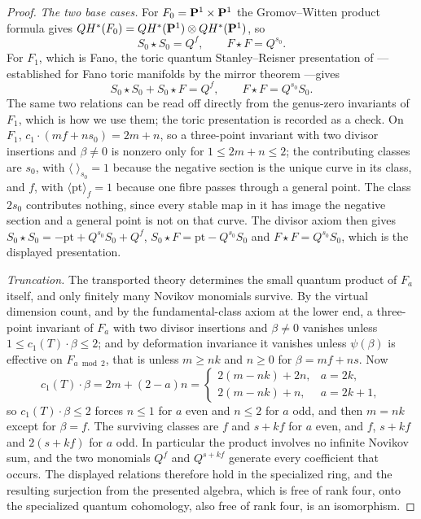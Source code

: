 \begin{proof}
\emph{The two base cases.}  For \(F_0=\mathbf P^1\times\mathbf P^1\) the Gromov--Witten
product formula \cite{BehrendProduct} gives
\(QH^*(F_0)=QH^*(\mathbf P^1)\otimes QH^*(\mathbf P^1)\), so
\[
 S_0\star S_0=Q^f,\qquad F\star F=Q^{s_0}.
\]
For \(F_1\), which is Fano, the toric quantum Stanley--Reisner presentation of
\cite[Section~5]{Batyrev}---established for Fano toric manifolds by the mirror
theorem \cite[Theorem~0.1]{Givental}---gives
\[
 S_0\star S_0+S_0\star F=Q^f,\qquad F\star F=Q^{s_0}S_0.
\]
The same two relations can be read off directly from the genus-zero invariants
of \(F_1\), which is how we use them; the toric presentation is recorded as a
check.  On \(F_1\), \(c_1\cdot(mf+ns_0)=2m+n\), so a three-point invariant
with two divisor insertions and \(\beta\ne0\) is nonzero only for
\(1\le 2m+n\le2\); the contributing
classes are \(s_0\), with \(\langle\;\rangle_{s_0}=1\) because the negative
section is the unique curve in its class, and \(f\), with
\(\langle\mathrm{pt}\rangle_f=1\) because one fibre passes through a general
point.  The class \(2s_0\) contributes nothing, since every stable map in it has
image the negative section and a general point is not on that curve.  The divisor
axiom then gives \(S_0\star S_0=-\mathrm{pt}+Q^{s_0}S_0+Q^f\),
\(S_0\star F=\mathrm{pt}-Q^{s_0}S_0\) and \(F\star F=Q^{s_0}S_0\), which is the
displayed presentation.

\emph{Truncation.}  The transported theory determines the small quantum product
of \(F_a\) itself, and only finitely many Novikov monomials survive.  By the
virtual dimension count, and by the fundamental-class axiom at the lower end, a
three-point invariant of \(F_a\) with two divisor insertions and \(\beta\ne0\)
vanishes unless \(1\le c_1(T)\cdot\beta\le2\); and by deformation invariance it
vanishes
unless \(\psi(\beta)\) is effective on \(F_{a\bmod2}\), that is unless
\(m\ge nk\) and \(n\ge0\) for \(\beta=mf+ns\).  Now
\[
 c_1(T)\cdot\beta=2m+(2-a)n=
 \begin{cases}
  2(m-nk)+2n, & a=2k,\\
  2(m-nk)+n, & a=2k+1,
 \end{cases}
\]
so \(c_1(T)\cdot\beta\le2\) forces \(n\le1\) for \(a\) even and \(n\le2\)
for \(a\) odd, and then \(m=nk\) except for \(\beta=f\).  The surviving classes
are \(f\) and \(s+kf\) for \(a\) even, and \(f\), \(s+kf\) and \(2(s+kf)\)
for \(a\) odd.  In particular the product involves no infinite Novikov sum, and
the two monomials \(Q^f\) and \(Q^{s+kf}\) generate every coefficient that
occurs.  The displayed relations therefore hold in the specialized ring, and the
resulting surjection from the presented algebra, which is free of rank four,
onto the specialized quantum cohomology, also free of rank four, is an
isomorphism.


\end{proof}
